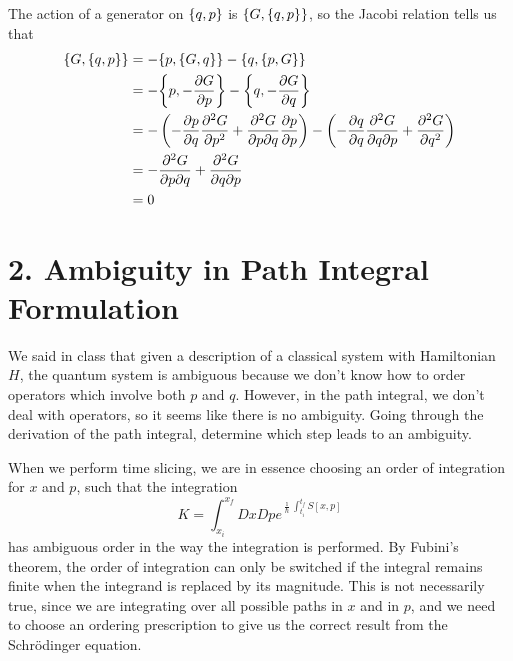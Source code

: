 \documentclass[a4paper,twoside]{article}
\begin{document}
\begin{itemize}
        \begin{problem}
            The action of a generator on $ \pb{q}{p} $ is $ \pb{G}{\pb{q}{p}} $, so the Jacobi relation tells us that
            \begin{align}
                \pb{G}{\pb{q}{p}} &= -\pb{p}{\pb{G}{q}} - \pb{q}{\pb{p}{G}} \\
                &= - \pb{p}{- \pdv{G}{p}} - \pb{q}{- \pdv{G}{q}} \\
                &= - \left( -\pdv{p}{q}\pdv[2]{G}{p} + \pdv{G}{p}{q} \pdv{p}{p} \right) - \left( -\pdv{q}{q} \pdv{G}{q}{p} + \pdv[2]{G}{q}\right) \\
                &= - \pdv{G}{p}{q} + \pdv{G}{q}{p} \\
                &= 0
            \end{align}
        \end{problem}
\end{itemize}


\section*{2. Ambiguity in Path Integral Formulation}
We said in class that given a description of a classical system with Hamiltonian $ H $, the quantum system is ambiguous because we don't know how to order operators which involve both $ p $ and $ q $. However, in the path integral, we don't deal with operators, so it seems like there is no ambiguity. Going through the derivation of the path integral, determine which step leads to an ambiguity.
\begin{problem}
    When we perform time slicing, we are in essence choosing an order of integration for $ x $ and $ p $, such that the integration
    \begin{equation}
        K = \int_{x_i}^{x_f} Dx Dp e^{\frac{\imath}{\hbar} \int_{t_i}^{t_f} S[x,p]}
    \end{equation}
    has ambiguous order in the way the integration is performed. By Fubini's theorem, the order of integration can only be switched if the integral remains finite when the integrand is replaced by its magnitude. This is not necessarily true, since we are integrating over all possible paths in $ x $ and in $ p $, and we need to choose an ordering prescription to give us the correct result from the Schr\"odinger equation.
\end{problem}
\end{document}
